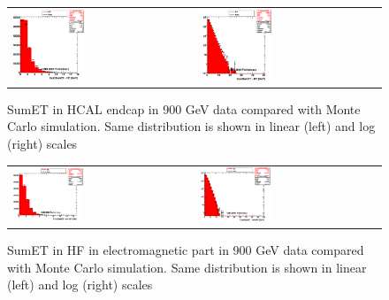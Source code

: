 \begin{figure}[h!]
 \centering
 \begin{tabular}{ll}
  \includegraphics[width=0.40\textwidth]{plots_DataVsMC_MB_900GeV/h_caloSumetHE_lin.eps} &
  \includegraphics[width=0.40\textwidth]{plots_DataVsMC_MB_900GeV/h_caloSumetHE.eps} \\
 \end{tabular}
\caption{SumET in HCAL endcap in 900 GeV data compared
   with Monte Carlo simulation. Same distribution is shown in linear (left) and log (right) scales
          \label{fig:DataVsMC_MB_900_8}}
\end{figure}

\begin{figure}[h!]
 \centering
 \begin{tabular}{ll}
  \includegraphics[width=0.40\textwidth]{plots_DataVsMC_MB_900GeV/h_caloSumetEmHF_lin.eps} &
  \includegraphics[width=0.40\textwidth]{plots_DataVsMC_MB_900GeV/h_caloSumetEmHF.eps} \\
 \end{tabular}
 \caption{SumET in HF in electromagnetic part in 900 GeV data compared
   with Monte Carlo simulation. Same distribution is shown in linear (left) and log (right) scales
          \label{fig:DataVsMC_MB_900_9}}
\end{figure}

